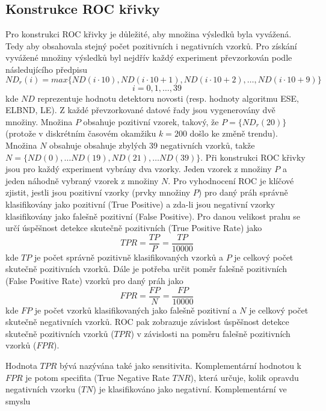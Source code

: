 \subsection{Konstrukce ROC křivky}\label{chap:roc_specs}
Pro konstrukci ROC křivky je důležité, aby množina výsledků byla vyvážená. Tedy aby obsahovala stejný počet pozitivních i negativních vzorků. Pro získání vyvážené množiny výsledků byl nejdřív každý experiment převzorkován podle následujícího předpisu
\begin{equation}
    ND_r(i) = max\{ND(i \cdot 10), ND(i \cdot 10 + 1), ND(i \cdot 10 + 2), \dots, ND(i \cdot 10 + 9)\}
\end{equation}
\begin{equation*}
i = 0,1,\dots,39
\end{equation*}
kde $ND$ reprezentuje hodnotu detektoru novosti (resp. hodnoty algoritmu ESE, ELBND, LE). Z každé převzorkované datové řady jsou vygenerovány dvě množiny. Množina $P$ obsahuje pozitivní vzorek, takový, že $P=\{ND_r(20)\}$ (protože v diskrétním časovém okamžiku $k=200$ došlo ke změně trendu).  Množina $N$ obsahuje obsahuje zbylých 39 negativních vzorků, takže $N=\{ND(0), \dots ND(19), ND(21), \dots ND(39) \}$. Při konstrukci ROC křivky jsou pro každý experiment vybrány dva vzorky. Jeden vzorek z množiny $P$ a jeden náhodně vybraný vzorek z množiny $N$. Pro vyhodnocení ROC je klíčové zjistit, jestli jsou pozitivní vzorky (prvky množiny $P$) pro daný práh správně klasifikovány jako pozitivní (True Positive) a zda-li jsou negativní vzorky klasifikovány jako falešně pozitivní (False Positive). Pro danou velikost prahu se určí úspěšnost detekce skutečně pozitivních (True Positive Rate) jako 
\begin{equation}
TPR=\frac{TP}{P}=\frac{TP}{10000}
\end{equation}
kde $TP$ je počet správně pozitivně klasifikovaných vzorků a $P$ je celkový počet skutečně pozitivních vzorků. Dále je potřeba určit poměr falešně pozitivních (False Positive Rate) vzorků pro daný práh jako
\begin{equation}
FPR=\frac{FP}{N}=\frac{FP}{10000}
\end{equation}
kde $FP$ je počet vzorků klasifikovaných jako falešně pozitivní a $N$ je celkový počet skutečně negativních vzorků. ROC pak zobrazuje závislost úspěšnost detekce skutečně pozitivních vzorků ($TPR$) v závislosti na poměru falešně pozitivních vzorků ($FPR$).
\par 
Hodnota $TPR$ bývá nazývána také jako sensitivita. Komplementární hodnotou k $FPR$ je potom specifita (True Negative Rate $TNR$), která určuje, kolik opravdu negativních vzorku ($TN$) je klasifikováno jako negativní. Komplementární ve smyslu
